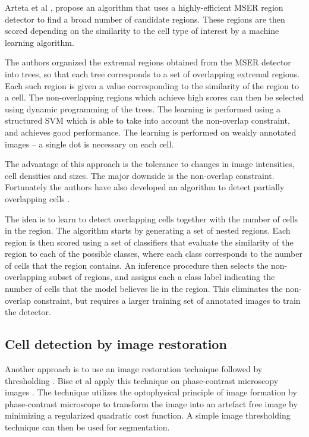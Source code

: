 Arteta et al \cite{arteta12}\cite{arteta13}, propose an algorithm that uses a highly-efficient MSER region detector \cite{matas02} to find a broad number of candidate regions. These regions are then scored depending on the similarity to the cell type of interest by a machine learning algorithm. 

The authors organized the extremal regions obtained from the MSER detector into trees, so that each tree corresponds to a set of overlapping extremal regions. Each such region is given a value corresponding to the similarity of the region to a cell. The non-overlapping regions which achieve high scores can then be selected using dynamic programming of the trees. The learning is performed using a structured SVM \cite{joachims09} which is able to take into account the non-overlap constraint, and achieves good performance. The learning is performed on weakly annotated images -- a single dot is necessary on each cell.

The advantage of this approach is the tolerance to changes in image intensities, cell densities and sizes. The major downside is the non-overlap constraint. Fortunately the authors have also developed an algorithm to detect partially overlapping cells \cite{arteta13}. 

The idea is to learn to detect overlapping cells together with the number of cells in the region. The algorithm starts by generating a set of nested regions. Each region is then scored using a set of classifiers that evaluate the similarity of the region to each of the possible classes, where each class corresponds to the number of cells that the region contains. An inference procedure then selects the non-overlapping subset of regions, and assigns each a class label indicating the number of cells that the model believes lie in the region. This eliminates the non-overlap constraint, but requires a larger training set of annotated images to train the detector.

\subsection{Cell detection by image restoration \statusfirstdraft}

Another approach is to use an image restoration technique followed by thresholding \cite{bise11} \cite{huh13}. Bise et al \cite{bise11} apply this technique on phase-contrast microscopy images . The technique utilizes the optophysical principle of image formation by phase-contrast microscope to transform the image into an artefact free image by minimizing a regularized quadratic cost function. A simple image thresholding technique can then be used for segmentation.

